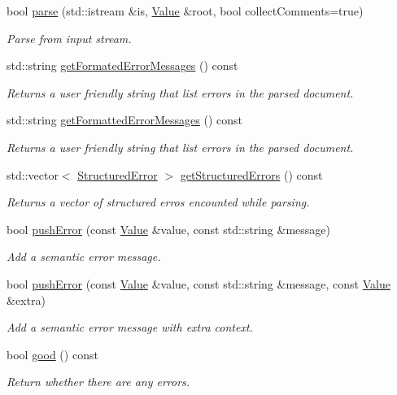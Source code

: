 \begin{DoxyCompactItemize}
bool \mbox{\hyperlink{class_json_1_1_reader_a8d0347e6b47343e4bc68be7ecdb9c4e9}{parse}} (std\+::istream \&is, \mbox{\hyperlink{class_json_1_1_value}{Value}} \&root, bool collect\+Comments=true)
\begin{DoxyCompactList}\small\item\em Parse from input stream. \end{DoxyCompactList}\item 
std\+::string \mbox{\hyperlink{class_json_1_1_reader_a269793929575f925b629460c9c744da1}{get\+Formated\+Error\+Messages}} () const
\begin{DoxyCompactList}\small\item\em Returns a user friendly string that list errors in the parsed document. \end{DoxyCompactList}\item 
std\+::string \mbox{\hyperlink{class_json_1_1_reader_a5e624688f0794da1e737d2a15aa5cb84}{get\+Formatted\+Error\+Messages}} () const
\begin{DoxyCompactList}\small\item\em Returns a user friendly string that list errors in the parsed document. \end{DoxyCompactList}\item 
std\+::vector$<$ \mbox{\hyperlink{struct_json_1_1_reader_1_1_structured_error}{Structured\+Error}} $>$ \mbox{\hyperlink{class_json_1_1_reader_afa5aa28e5345b4a90c411a206b1d63b1}{get\+Structured\+Errors}} () const
\begin{DoxyCompactList}\small\item\em Returns a vector of structured erros encounted while parsing. \end{DoxyCompactList}\item 
bool \mbox{\hyperlink{class_json_1_1_reader_ade6c28e0ef00d8f2e0aa2283f91c3e37}{push\+Error}} (const \mbox{\hyperlink{class_json_1_1_value}{Value}} \&value, const std\+::string \&message)
\begin{DoxyCompactList}\small\item\em Add a semantic error message. \end{DoxyCompactList}\item 
bool \mbox{\hyperlink{class_json_1_1_reader_a9b474233c3a7c688e340e70665d45223}{push\+Error}} (const \mbox{\hyperlink{class_json_1_1_value}{Value}} \&value, const std\+::string \&message, const \mbox{\hyperlink{class_json_1_1_value}{Value}} \&extra)
\begin{DoxyCompactList}\small\item\em Add a semantic error message with extra context. \end{DoxyCompactList}\item 
bool \mbox{\hyperlink{class_json_1_1_reader_a86cbb42b3e6d4a4d6416473b1a8f6ae7}{good}} () const
\begin{DoxyCompactList}\small\item\em Return whether there are any errors. \end{DoxyCompactList}\end{DoxyCompactItemize}


